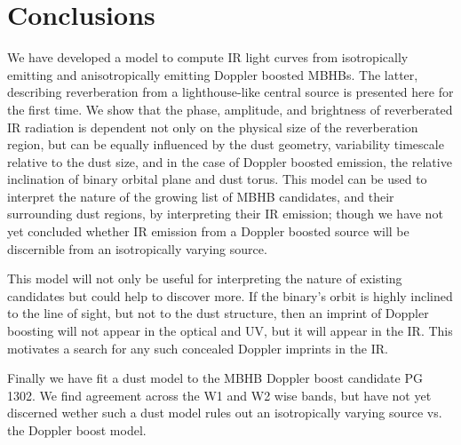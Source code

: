 \section{Conclusions}
We have developed a model to compute IR light curves from isotropically emitting and anisotropically emitting Doppler boosted MBHBs. The latter, describing reverberation from a lighthouse-like central source is presented here for the first time. We show that the phase, amplitude, and brightness of reverberated IR radiation is dependent not only on the physical size of the reverberation region, but can be equally influenced by the dust geometry, variability timescale relative to the dust size, and in the case of Doppler boosted emission, the relative inclination of binary orbital plane and dust torus. This model can be used to interpret the nature of the growing list of MBHB candidates, and their surrounding dust regions, by interpreting their IR emission; though we have not yet concluded whether IR emission from a Doppler boosted source will be discernible from an isotropically varying source.


This model will not only be useful for interpreting the nature of existing candidates but could help to discover more. If the binary's orbit is highly inclined to the line of sight, but not to the dust structure, then an imprint of Doppler boosting will not appear in the optical and UV, but it will appear in the IR. This motivates a search for any such concealed Doppler imprints in the IR.

Finally we have fit a dust model to the MBHB Doppler boost candidate PG 1302. We find agreement across the W1 and W2 wise bands, but have not yet discerned wether such a dust model rules out an isotropically varying source vs. the Doppler boost model.




